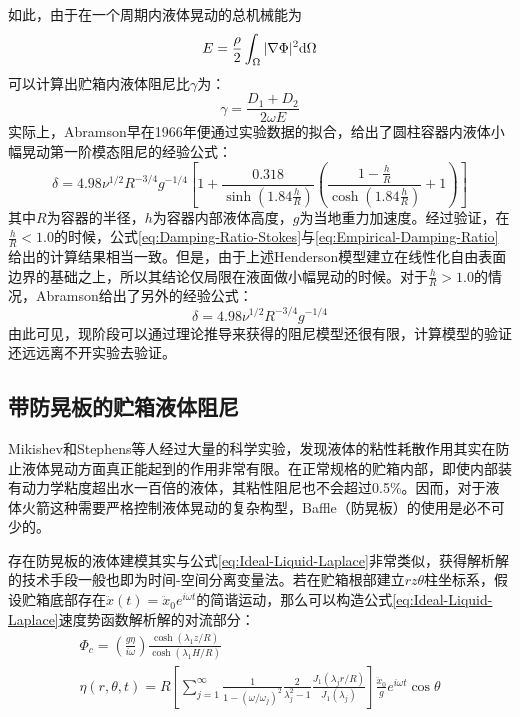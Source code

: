 如此，由于在一个周期内液体晃动的总机械能为
\begin{equation}
	E=\frac{\rho}{2}\int_\Omega |\nabla \Phi|^2\mathrm{d} \Omega
\end{equation}
可以计算出贮箱内液体阻尼比$\gamma$为\cite{Abramson:1966, Miles:1958}：
\begin{equation}
	\label{eq:Damping-Ratio-Stokes}
	\gamma=\frac{D_1+D_2}{2\omega E}
\end{equation}
实际上，Abramson早在1966年便通过实验数据的拟合，给出了圆柱容器内液体小幅晃动第一阶模态阻尼的经验公式\cite{Abramson:1966}：
\begin{equation}
	\label{eq:Empirical-Damping-Ratio}
	\delta=4.98\nu^{1/2}R^{-3/4}g^{-1/4}\left[ 1+\frac{0.318}{\sinh (1.84{\displaystyle\frac{h}{R}})} \left( \frac{1-{\displaystyle\frac{h}{R}}}{\cosh(1.84{\displaystyle\frac{h}{R}})} +1\right) \right]
\end{equation}
其中$R$为容器的半径，$h$为容器内部液体高度，$g$为当地重力加速度。经过验证，在$\displaystyle \frac{h}{R}<1.0$的时候，公式\eqref{eq:Damping-Ratio-Stokes}与\eqref{eq:Empirical-Damping-Ratio}给出的计算结果相当一致\cite{WangWei:2005,WangWei:2006}。但是，由于上述Henderson模型建立在线性化自由表面边界的基础之上，所以其结论仅局限在液面做小幅晃动的时候。对于$\displaystyle \frac{h}{R}>1.0$的情况，Abramson给出了另外的经验公式：
\begin{equation}
	\delta=4.98\nu^{1/2}R^{-3/4}g^{-1/4}
\end{equation}
由此可见，现阶段可以通过理论推导来获得的阻尼模型还很有限，计算模型的验证还远远离不开实验去验证。

\subsection{带防晃板的贮箱液体阻尼}
Mikishev和Stephens等人经过大量的科学实验，发现液体的粘性耗散作用其实在防止液体晃动方面真正能起到的作用非常有限\cite{Mikishev:1961, Stephens:1962}。在正常规格的贮箱内部，即使内部装有动力学粘度超出水一百倍的液体，其粘性阻尼也不会超过0.5\si{\percent}。因而，对于液体火箭这种需要严格控制液体晃动的复杂构型，Baffle（防晃板）的使用是必不可少的。

存在防晃板的液体建模其实与公式\eqref{eq:Ideal-Liquid-Laplace}非常类似，获得解析解的技术手段一般也即为时间-空间分离变量法。若在贮箱根部建立$rz\theta$柱坐标系，假设贮箱底部存在$\ddot{x}(t)=\ddot{x}_0e^{\num{i}\omega t}$的简谐运动，那么可以构造公式\eqref{eq:Ideal-Liquid-Laplace}速度势函数解析解的对流部分\cite{Haroun:1981}：
\begin{gather}
	\Phi_c=\left( \frac{g\eta}{\num{i} \omega} \right)\frac{\cosh(\lambda_1 z/R)}{\cosh(\lambda_1 H/R)} \\
	\eta(r,\theta,t)=R\left[ \sum_{j=1}^\infty \frac{1}{1-{(\omega/\omega_j)}^2} \frac{2}{\lambda_j^2-1} \frac{J_1(\lambda_j r/R)}{J_1(\lambda_j)} \right]\frac{\ddot{x}_0}{g}e^{\num{i}\omega t} \cos\theta \nonumber
\end{gather}

